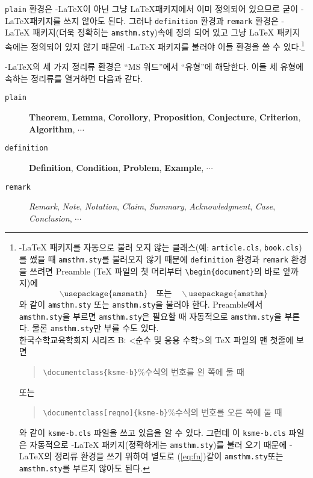 \documentclass[a4paper,10pt]{amsproc}
\newcommand\amsthmstyle{\texttt{amsthm.sty}}
\newcommand\env[1]{\texttt{#1}}
\begin{document}
\env{plain} 환경은 \AmS-\LaTeX 이 아닌 그냥 \LaTeX 패키지에서 이미
정의되어 있으므로 굳이 \AmS-\LaTeX 패키지를 쓰지 않아도 된다. 그러나
\env{definition} 환경과 \env{remark} 환경은
\AmS-\LaTeX{} 패키지(더욱 정확히는 \amsthmstyle )속에 정의 되어
있고 그냥 \LaTeX{} 패키지 속에는 정의되어 있지 않기 때문에
\AmS-\LaTeX{} 패키지를 불러야 이들 환경을 쓸 수 있다.\footnote{\label{a3}%
  \AmS-\LaTeX{} 패키지를 자동으로 불러 오지 않는 클래스(예:
  \texttt{article.cls}, \texttt{book.cls})를 썼을 때
  \amsthmstyle 를 불러오지 않기 때문에 \env{definition} 환경과
  \env{remark} 환경을 쓰려면 Preamble (\TeX{} 파일의 첫 머리부터
  \texttt{\textbackslash begin\{document\}}의 바로 앞까지)에
  \begin{displaymath}\label{eq:fn}
    \backslash\texttt{usepackage\{amsmath\}}\quad  \mbox{또는} \quad
    \backslash\texttt{usepackage\{amsthm\}}    \tag{$\ast\!\ast\!\ast$}
  \end{displaymath}
  와 같이 \amsthmstyle{} 또는 \amsthmstyle 을 불러야 한다.
  Preamble에서 \amsthmstyle 을 부르면 \amsthmstyle 은 필요할
  때 자동적으로 \amsthmstyle 을 부른다. 물론 \amsthmstyle 만
  부를 수도 있다.\\
  \indent 한국수학교육학회지 시리즈 B: <순수 및 응용 수학>의
  \TeX{} 파일의 맨 첫줄에 보면
  \begin{quote}
  \texttt{\textbackslash documentclass\{ksme-b\}}{\%}수식의 번호를 왼 쪽에 둘 때
  \end{quote}
  또는
  \begin{quote}
  \texttt{\textbackslash documentclass[reqno]\{ksme-b\}}{\%}수식의 번호를 오른 쪽에 둘 때
  \end{quote}
  와 같이 \texttt{ksme-b.cls} 파일을 쓰고 있음을 알 수 있다. 그런데
  이 \texttt{ksme-b.cls} 파일은 자동적으로
  \AmS-\LaTeX{} 패키지(정확하게는 \amsthmstyle )를 불러 오기
  때문에 \AmS-\LaTeX 의 정리류 환경을 쓰기 위하여 별도로
  (\ref{eq:fn})\와 같이 \amsthmstyle  또는 \amsthmstyle 를 부르지 않아도 된다.}

\AmS-\LaTeX 의 세 가지 정리류 환경은 ``MS 워드''에서 ``유형''에
해당한다. 이들 세 유형에 속하는 정리류를 열거하면 다음과 같다.

\begin{description}
\item[\env{plain}] \textbf{Theorem}, \textbf{Lemma},
  \textbf{Corollory}, \textbf{Proposition}, \textbf{Conjecture},
  \textbf{Criterion}, \textbf{Algorithm}, $\cdots$
\item[\env{definition}] \textbf{Definition}, \textbf{Condition},
  \textbf{Problem}, \textbf{Example}, $\cdots$
\item[\env{remark}] \textit{Remark}, \textit{Note},
  \textit{Notation}, \textit{Claim}, \textit{Summary}, \textit{Acknowledgment}, 
  \textit{Case}, \textit{Conclusion}, $\cdots$
\end{description}
\end{document}
